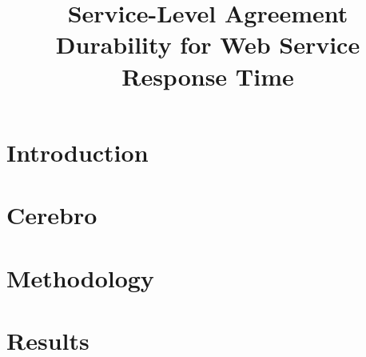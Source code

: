 \documentclass[conference,compsoc]{IEEEtran}
\begin{document}
%
\title{Service-Level Agreement Durability for Web Service Response Time}

\author{
}

\maketitle


\begin{abstract}

\end{abstract}

\vspace{-0.1in}
\section{Introduction}
\vspace{-0.1in}
\label{sec:intro}


\vspace{-0.1in}
\section{Cerebro}
\vspace{-0.1in}
\label{sec:cerebro}


\vspace{-0.1in}
\section{Methodology}
\vspace{-0.1in}
\label{sec:methodology}


\vspace{-0.1in}
\section{Results}
\vspace{-0.1in}
\label{sec:results}


\vspace{-0.1in}
\end{document}
